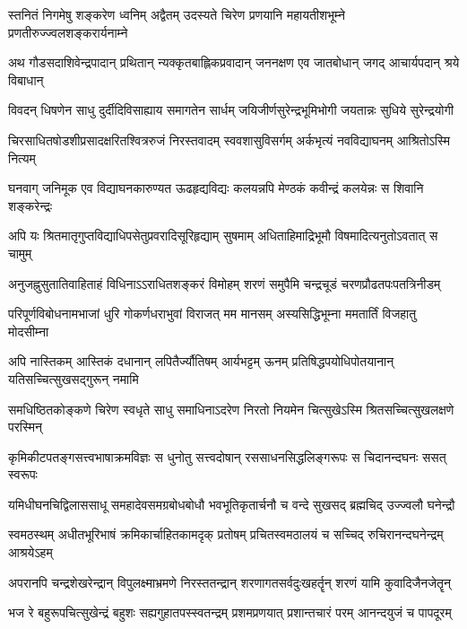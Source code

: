 \twolineshloka
{स्तनितं निगमेषु शङ्करेण ध्वनिम् अद्वैतम् उदस्यते चिरेण}
{प्रणयानि महायतीशभूम्ने प्रणतीरुज्ज्वलशङ्करार्यनाम्ने}%

\twolineshloka
{अथ गौडसदाशिवेन्द्रपादान् प्रथितान् न्यक्कृतबाह्लिकप्रवादान्}
{जननक्षण एव जातबोधान् जगद् आचार्यपदान् श्रये विबाधान्}%

\twolineshloka
{विवदन् धिषणेन साधु दुर्दीदिविसाह्याय समागतेन सार्धम्}
{जयिजीर्णसुरेन्द्रभूमिभोगी जयतान्नः सुधिये सुरेन्द्रयोगी}%

\twolineshloka
{चिरसाधितषोडशीप्रसादक्षरितश्वित्ररुजं निरस्तवादम्}
{स्ववशासुविसर्गम् अर्कभृत्यं नवविद्याघनम् आश्रितोऽस्मि नित्यम्}%

\twolineshloka
{घनवाग् जनिमूक एव विद्याघनकारुण्यत ऊढहृद्यविद्यः}
{कलयन्नपि मेण्ठकं कवीन्द्रं कलयेन्नः स शिवानि शङ्करेन्द्रः}%

\twolineshloka
{अपि यः श्रितमातृगुप्तविद्याधिपसेतुप्रवरादिसूरिहृद्याम्}
{सुषमाम् अधिताहिमाद्रिभूमौ विषमादित्यनुतोऽवतात् स चामुम्}%

\twolineshloka
{अनुजह्नुसुतातिवाहिताहं विधिनाऽऽराधितशङ्करं विमोहम्}
{शरणं समुपैमि चन्द्रचूडं चरणप्रौढतपःपतत्रिनीडम्}%

\twolineshloka
{परिपूर्णविबोधनामभाजां धुरि गोकर्णधराभुवां विराजत्}
{मम मानसम् अस्यसिद्धिभूम्ना ममतार्तिं विजहातु मोदसीम्ना}%

\twolineshloka
{अपि नास्तिकम् आस्तिकं दधानान् लपितैर्ज्यौतिषम् आर्यभट्टम् ऊनम्}
{प्रतिषिद्धपयोधिपोतयानान् यतिसच्चित्सुखसद्गुरून् नमामि}%

\twolineshloka
{समधिष्ठितकोङ्कणे चिरेण स्वधृते साधु समाधिनाऽदरेण}
{निरतो नियमेन चित्सुखेऽस्मि श्रितसच्चित्सुखलक्षणे परस्मिन्}%

\twolineshloka
{कृमिकीटपतङ्गसत्त्वभाषाक्रमविज्ञः स धुनोतु सत्त्वदोषान्}
{रससाधनसिद्धलिङ्गरूपः स चिदानन्दघनः ससत् स्वरूपः}%

\twolineshloka
{यमिधीघनचिद्विलाससाधू समहादेवसमग्रबोधबोधौ}
{भवभूतिकृतार्चनौ च वन्दे सुखसद् ब्रह्मचिद् उज्ज्वलौ घनेन्द्रौ}%

\twolineshloka
{स्वमठस्थम् अधीतभूरिभाषं क्रमिकार्चाहितकामदृक् प्रतोषम्}
{प्रचितस्वमठालयं च सच्चिद् रुचिरानन्दघनेन्द्रम् आश्रयेऽहम्}%

\twolineshloka
{अपरानपि चन्द्रशेखरेन्द्रान् विपुलक्ष्माभ्रमणे निरस्ततन्द्रान्}
{शरणागतसर्वदुःखहर्तॄन् शरणं यामि कुवादिजैनजेतॄन्}%

\twolineshloka
{भज रे बहुरूपचित्सुखेन्द्रं बहुशः सह्यगुहातपस्स्वतन्द्रम्}
{प्रशमप्रणयात् प्रशान्तचारं परम् आनन्दयुजं च पापदूरम्}%

